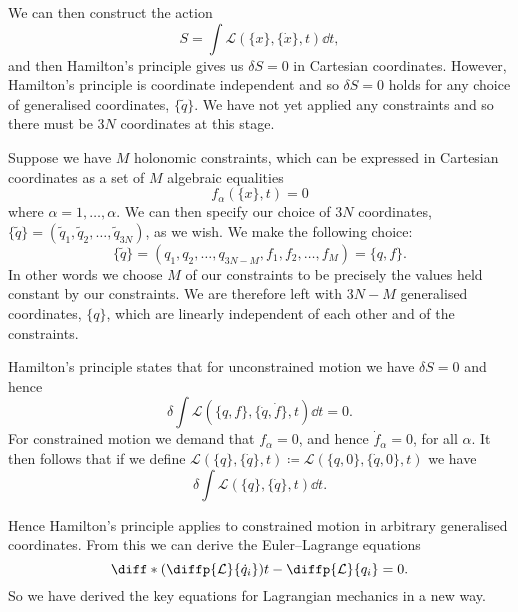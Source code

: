 \documentclass[fleqn]{NotesClass}
\newcommand*{\lagrangian}{\mathcal{L}}
\begin{document}
    We can then construct the action
    \begin{equation}
        S = \int \lagrangian(\{x\}, \{\dot{x}\}, t) \dd{t},
    \end{equation}
    and then Hamilton's principle gives us \(\delta S = 0\) in Cartesian coordinates.
    However, Hamilton's principle is coordinate independent and so \(\delta S = 0\) holds for any choice of generalised coordinates, \(\{\tilde{q}\}\).
    We have not yet applied any constraints and so there must be \(3N\) coordinates at this stage.
    
    Suppose we have \(M\) holonomic constraints, which can be expressed in Cartesian coordinates as a set of \(M\) algebraic equalities
    \begin{equation}
        f_\alpha(\{x\}, t) = 0
    \end{equation}
    where \(\alpha = 1, \dotsc, \alpha\).
    We can then specify our choice of \(3N\) coordinates, \(\{\tilde{q}\} = (\tilde{q}_1, \tilde{q}_2, \dotsc, \tilde{q}_{3N})\), as we wish.
    We make the following choice:
    \begin{equation}
        \{\tilde{q}\} = (q_1, q_2, \dotsc, q_{3N - M}, f_1, f_2, \dotsc, f_M) = \{q, f\}.
    \end{equation}
    In other words we choose \(M\) of our constraints to be precisely the values held constant by our constraints.
    We are therefore left with \(3N - M\) generalised coordinates, \(\{q\}\), which are linearly independent of each other and of the constraints.
    
    Hamilton's principle states that for unconstrained motion we have \(\delta S = 0\) and hence
    \begin{equation}
        \delta \int \lagrangian(\{q, f\}, \{\dot{q}, \dot{f}\}, t) \dd{t} = 0.
    \end{equation}
    For constrained motion we demand that \(f_\alpha = 0\), and hence \(\dot{f}_\alpha = 0\), for all \(\alpha\).
    It then follows that if we define \(\lagrangian(\{q\}, \{\dot{q}\}, t) \coloneqq \lagrangian(\{q, 0\}, \{\dot{q}, 0\}, t)\) we have
    \begin{equation}
        \delta\int \lagrangian(\{q\}, \{\dot{q}\}, t) \dd{t}.
    \end{equation}
    
    Hence Hamilton's principle applies to constrained motion in arbitrary generalised coordinates.
    From this we can derive the Euler--Lagrange equations
    \begin{equation}
        \diff*{\left( \diffp{\lagrangian}{\dot{q}_i} \right)}{t} - \diffp{\lagrangian}{q_i} = 0.
    \end{equation}
    So we have derived the key equations for Lagrangian mechanics in a new way.
    
\end{document}
